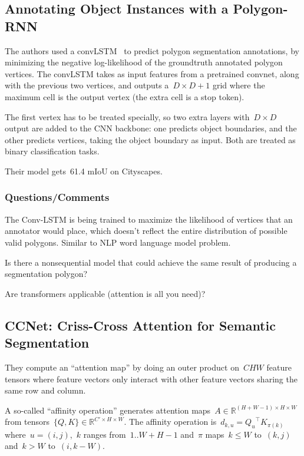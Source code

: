 \documentclass[a4paper, 12pt]{article}
\begin{document}
\subsection{Annotating Object Instances with a
            Polygon-RNN~\cite{castrejon2017annotating}}

The authors used a convLSTM~\cite{shi2015convolutional} to predict polygon
segmentation annotations, by minimizing the negative log-likelihood of the
groundtruth annotated polygon vertices. The convLSTM takes as input features
from a pretrained convnet, along with the previous two vertices, and outputs
a~$D \times D + 1$ grid where the maximum cell is the output vertex (the extra
cell is a stop token).

The first vertex has to be treated specially, so two extra layers
with~$D \times D$ output are added to the CNN backbone: one predicts object
boundaries, and the other predicts vertices, taking the object boundary as
input. Both are treated as binary classification tasks.

Their model gets~\num{61.4} mIoU on Cityscapes.


\subsubsection{Questions/Comments}

The Conv-LSTM is being trained to maximize the likelihood of vertices that an
annotator would place, which doesn't reflect the entire distribution of
possible valid polygons. Similar to NLP word language model problem.

Is there a nonsequential model that could achieve the same result of producing
a segmentation polygon?

Are transformers applicable (attention is all you need)?


\subsection{CCNet: Criss-Cross Attention for Semantic
            Segmentation~\cite{huang2018ccnet}}

They compute an ``attention map'' by doing an outer product on~$CHW$ feature
tensors where feature vectors only interact with other feature vectors sharing
the same row and column.

A so-called ``affinity operation'' generates attention
maps~$A\in \mathbb{R}^{(H + W - 1)\times H\times W}$ from tensors~$\{Q, K\} \in
\mathbb{R}^{C'\times H\times W}$.
The affinity operation is~$d_{k,u} = {Q_u}^\intercal K_{\pi(k)}$
where~$u = (i, j)$,~$k$ ranges from~$1..W + H - 1$ and~$\pi$ maps~$k \leq W$
to~$(k, j)$ and~$k > W$ to~$(i, k - W)$.
\end{document}
